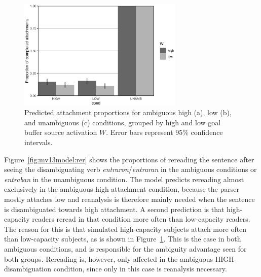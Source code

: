 \documentclass{cambridge7A}\usepackage[]{graphicx}\usepackage[]{color}
\newenvironment{knitrout}{}{} %
\begin{document}
\begin{figure}[!htbp]
\centering
\begin{knitrout}
\color{fgcolor}

{\centering \includegraphics[width=0.7\textwidth]{figures/fig-mv13modelatt-1} 

}



\end{knitrout}
\caption[Predicted attachment proportions by source activation at ambiguous and unambiguous attachments.]{Predicted attachment proportions for ambiguous high (a), low (b), and unambiguous (c) conditions, grouped by high and low goal buffer source activation $W$. Error bars represent 95\% confidence intervals.}
  \label{fig:mv13model:att}
\end{figure}

Figure~\ref{fig:mv13model:rer} shows the proportions of rereading the sentence after seeing the disambiguating verb \textit{entraron}/\textit{entraran} in the ambiguous conditions or \textit{entraban} in the unambiguous condition. The model predicts rereading almost exclusively in the ambiguous high-attachment condition, because the parser mostly attaches low and reanalysis is therefore mainly needed when the sentence is disambiguated towards high attachment. A second prediction is that high-capacity readers reread in that condition more often than low-capacity readers. 
The reason for this is that simulated high-capacity subjects attach more often than low-capacity subjects, as is shown in Figure~\ref{fig:mv13model:att}. This is the case in both ambiguous conditions, and is responsible for the ambiguity advantage seen for both groups. Rereading is, however, only affected in the ambiguous HIGH-disambiguation condition, since only in this case is reanalysis necessary. 
\end{document}

